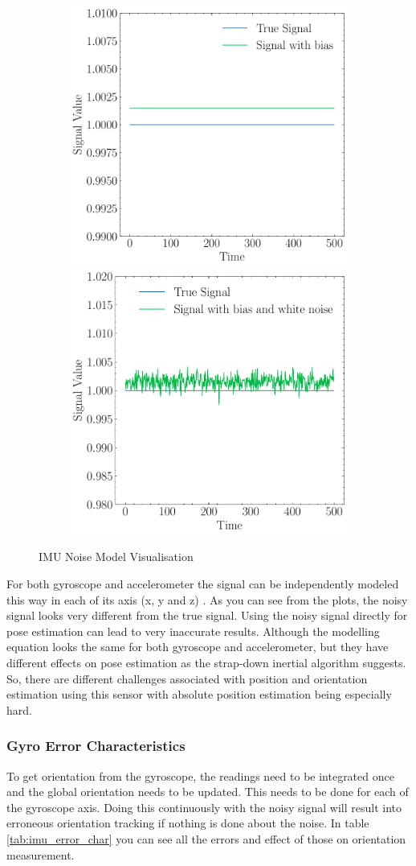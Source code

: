 \begin{figure}[H]
  \begin{subfigure}{\linewidth}
  \includegraphics[width=.5\linewidth]{images/fig_chapter2/noise_figs/signal_with_bias.pdf}\hfill
  \includegraphics[width=.5\linewidth]{images/fig_chapter2/noise_figs/signal_with_bias_and_noise.pdf}
  \end{subfigure}\par\medskip
  \caption{IMU Noise Model Visualisation}
\label{fig:imu_noise}
\end{figure}

For both gyroscope and accelerometer the signal can be independently modeled this way in each of its axis (x, y and z) \citep{imu_noise}. As you can see from the plots, the noisy signal looks very different from the true signal. Using the noisy signal directly for pose estimation can lead to very inaccurate results. Although the modelling equation looks the same for both gyroscope and accelerometer, but they have different effects on pose estimation as the strap-down inertial algorithm suggests. So, there are different challenges associated with position and orientation estimation using this sensor with absolute position estimation being especially hard.

\subsubsection{Gyro Error Characteristics}
To get orientation from the gyroscope, the readings need to be integrated once and the global orientation needs to be updated. This needs to be done for each of the gyroscope axis. Doing this continuously with the noisy signal will result into erroneous  orientation tracking if nothing is done about the noise. In table \ref{tab:imu_error_char} you can see all the errors and effect of those on orientation measurement.

